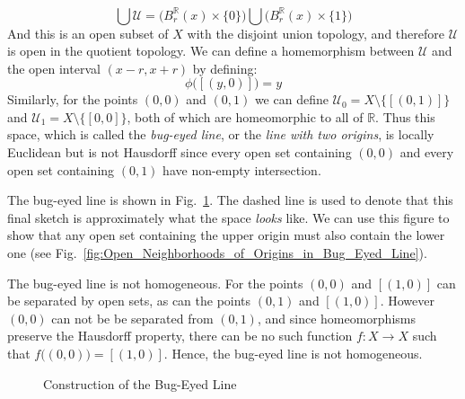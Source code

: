 \documentclass{article}                                                        %
\begin{document}
\begin{example}
\begin{equation}
                    \bigcup\mathcal{U}=\Big(B_{r}^{\mathbb{R}}(x)\times\{0\}\Big)
                        \bigcup\Big(B_{r}^{\mathbb{R}}(x)\times\{1\}\Big)
                \end{equation}
                And this is an open subset of $X$ with the disjoint union
                topology, and therefore $\mathcal{U}$ is open in the quotient
                topology. We can define a homemorphism between $\mathcal{U}$ and
                the open interval $(x-r,x+r)$ by defining:
                \begin{equation}
                    \phi\big([(y,0)]\big)=y
                \end{equation}
                Similarly, for the points $(0,0)$ and $(0,1)$ we can define
                $\mathcal{U}_{0}=X\setminus\{[(0,1)]\}$ and
                $\mathcal{U}_{1}=X\setminus\{[0,0]\}$, both of which are
                homeomorphic to all of $\mathbb{R}$. Thus this space, which is
                called the \textit{bug-eyed line}, or the
                \textit{line with two origins}, is
                locally Euclidean but is not Hausdorff since every open set
                containing $(0,0)$ and every open set containing $(0,1)$ have
                non-empty intersection.
        \end{example}
        The bug-eyed line is shown in
        Fig.~\ref{fig:Bug_Eyed_Line}. The dashed line is used to denote that
        this final sketch is approximately what the space \textit{looks}
        like. We can use this figure to show that any open set containing
        the upper origin must also contain the lower one
        (see Fig.~\ref{fig:Open_Neighborhoods_of_Origins_in_Bug_Eyed_Line}).
        \begin{example}
                The bug-eyed line is not homogeneous. For the points $(0,0)$ and
                $[(1,0)]$ can be separated by open sets, as can the points
                $(0,1)$ and $[(1,0)]$. However $(0,0)$ can not be be separated
                from $(0,1)$, and since homeomorphisms preserve the Hausdorff
                property, there can be no such function $f:X\rightarrow{X}$ such
                that $f\big((0,0)\big)=[(1,0)]$. Hence, the bug-eyed line is
                not homogeneous.
        \end{example}
        \begin{figure}[H]
                \centering
                \captionsetup{type=figure}
                
                \caption{Construction of the Bug-Eyed Line}
                \label{fig:Bug_Eyed_Line}
        \end{figure}
\end{document}
